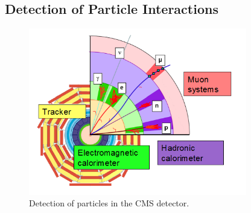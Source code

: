 \subsection{Detection of Particle Interactions}
\label{exp:particleDetection}

 \begin{figure}[htb]
  \begin{center}
    \includegraphics[width=270pt]{Figures/CMSParticles.png}
  \end{center}
  \caption[\fixspacing Detection of particles in the CMS detector]
	  {\fixspacing Detection of particles in the CMS detector.}
  \label{fig:CMSParticles}
 \end{figure}

